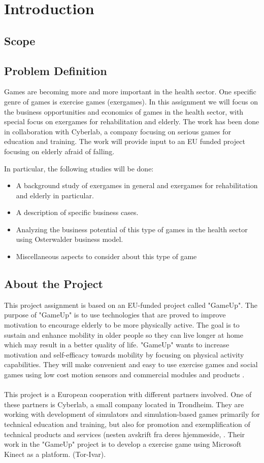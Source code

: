 \chapter{Introduction}
\section{Scope}
\section{Problem Definition}
Games are becoming more and more important in the health sector. One specific genre of games is exercise games (exergames). In this assignment we will focus on the business opportunities and economics of games in the health sector, with special focus on exergames for rehabilitation and elderly. The work has been done in collaboration with Cyberlab, a company focusing on serious games for education and training. The work will provide input to an EU funded project focusing on elderly afraid of falling.

In particular, the following studies will be done: 
\begin{itemize}
\renewcommand{\labelitemi}{$\bullet$}
\item A background study of exergames in general and exergames for rehabilitation and elderly in particular.
\item	A description of specific business cases.
\item	Analyzing the business potential of this type of games in the health sector using Osterwalder business model.
\item	Miscellaneous aspects to consider about this type of game
\end{itemize}

\section{About the Project}
This project assignment is based on an EU-funded project called "GameUp". The purpose of "GameUp" is to use technologies that are proved to improve motivation to encourage elderly to be more physically active. The goal is to sustain and enhance mobility in older people so they can live longer at home which may result in a better quality of life. "GameUp" wants to increase motivation and self-efficacy towards mobility by focusing on physical activity capabilities. They will make convenient and easy to use exercise games and social games using low cost motion sensors and commercial modules and products \cite{gameup}.\\ \\ This project is a European cooperation with different partners involved. One of these partners is Cyberlab, a small company located in Trondheim. They are working with development of simulators and simulation-based games primarily for technical education and training, but also for promotion and exemplification of technical products and services (nesten avskrift fra deres hjemmeside, \cite{cyberlab}. Their work in the "GameUp" project is to develop a exercise game using Microsoft Kinect as a platform. (Tor-Ivar).

